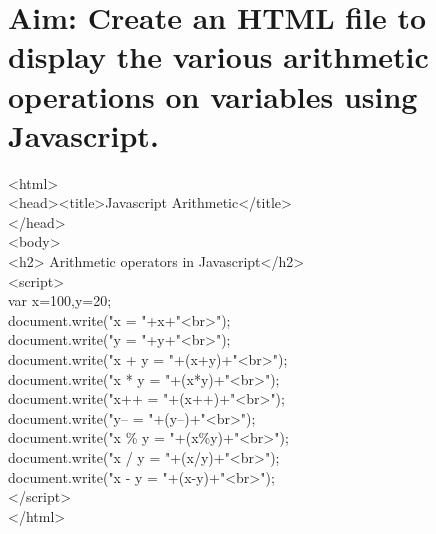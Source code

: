 \section*{\fontsize{16}{14}\selectfont Aim: Create an HTML file to display the various arithmetic operations on variables using Javascript.}
<html>\\
<head><title>Javascript Arithmetic</title>\\
</head>\\
<body>\\
<h2> Arithmetic operators in Javascript</h2>\\
<script>\\
var x=100,y=20;\\
document.write("x = "+x+"<br>");\\
document.write("y = "+y+"<br>");\\
document.write("x + y = "+(x+y)+"<br>");\\
document.write("x * y = "+(x*y)+"<br>");\\
document.write("x++ = "+(x++)+"<br>");\\
document.write("y-- = "+(y--)+"<br>");\\
document.write("x \% y = "+(x\%y)+"<br>");\\
document.write("x / y = "+(x/y)+"<br>");\\
document.write("x - y = "+(x-y)+"<br>");\\
</script>\\
</html>

